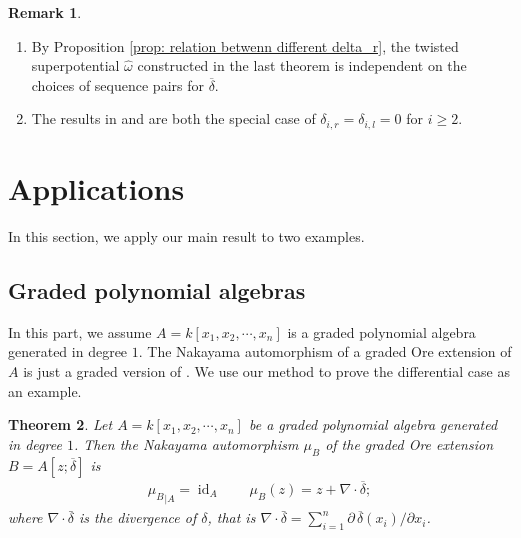 \documentclass[a4paper,10pt]{amsart}
\newtheorem{theorem}{Theorem}[section]
\theoremstyle{definition}
\newtheorem{remark}[theorem]{Remark}
\numberwithin{equation}{section}
\DeclareMathOperator{\id}{id}
\begin{document}
\begin{remark}
\begin{enumerate}
\item By Proposition \ref{prop: relation betwenn different delta_r}, the twisted superpotential $\hat{\omega}$ constructed in the last theorem is independent on the choices of sequence pairs for $\overline{\delta}$.
\item The results in \cite[Theorem 4.4]{HVZ} and \cite[Theorem 0.1(ii)]{HVZ1} are both the special case of $\delta_{i,r}=\delta_{i,l}=0$ for $i\geq 2$.
\end{enumerate}
\end{remark}


\section{Applications}
In this section, we apply our main result to two examples.

\subsection{Graded polynomial algebras} In this part, we assume $A=k[x_1,x_2,\cdots,x_n]$ is a graded polynomial algebra generated in degree $1$. The Nakayama automorphism of a graded Ore extension of $A$ is just a graded version of \cite[Theorem 1.1]{LM}. We use our method to  prove the differential case as an example.


\begin{theorem}\label{thm: NA of Ore ext over Polynomial}\cite[Theorem 1.1(1)]{LM} Let $A=k[x_1,x_2,\cdots,x_n]$ be a graded polynomial algebra generated in degree $1$. Then the Nakayama automorphism $\mu_B$ of the graded Ore extension $B=A[z;\overline{\delta}]$ is
\begin{align*}
{\mu_B}_{|A}=\id_A\qquad
\mu_B(z)=z+\nabla\cdot {\overline{\delta}};
\end{align*}
where $\nabla\cdot {\bar{\delta}}$ is the divergence of $\delta$, that is $\nabla\cdot {\bar{\delta}}=\sum_{i=1}^n \partial\, \overline{\delta}(x_i)/\partial x_i$.
\end{theorem}
\end{document}
